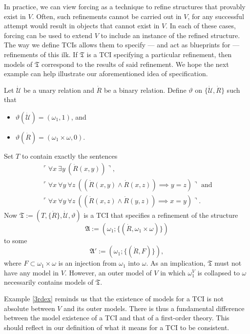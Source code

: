\documentclass[12pt]{article}
\numberwithin{equation}{section}
\begin{document}
In practice, we can view forcing as a technique to refine structures that provably exist in $V$. Often, such refinements cannot be carried out in $V$, for any successful attempt would result in objects that cannot exist in $V$. In each of these cases, forcing can be used to extend $V$ to include an instance of the refined structure. The way we define TCIs allows them to specify --- and act as blueprints for --- refinements of this ilk. If $\mathfrak{T}$ is a TCI specifying a particular refinement, then models of $\mathfrak{T}$ correspond to the results of said refinement. We hope the next example can help illustrate our aforementioned idea of specification.

\begin{ex}\label{3rdex}
Let $\dot{\mathcal{U}}$ be a unary relation and $\dot{R}$ be a binary relation. Define $\vartheta$ on $\{\dot{\mathcal{U}}, \dot{R}\}$ such that
\begin{itemize}
    \item $\vartheta(\dot{\mathcal{U}}) = (\omega_1, 1)$, and
    \item $\vartheta(\dot{R}) = (\omega_1 \times \omega, 0)$.
\end{itemize}
Set $T$ to contain exactly the sentences 
\begin{gather*}
    \ulcorner \forall x \ \exists y \ (\dot{R}(x, y)) \urcorner \text{,} \\
    \ulcorner \forall x \ \forall y \ \forall z \ ((\dot{R}(x, y) \wedge \dot{R}(x, z)) \implies y = z) \urcorner \text{ and} \\
    \ulcorner \forall x \ \forall y \ \forall z \ ((\dot{R}(x, z) \wedge \dot{R}(y, z)) \implies x = y) \urcorner \text{.}
\end{gather*}
Now $\mathfrak{T} := (T, \{\dot{R}\}, \dot{\mathcal{U}}, \vartheta)$ is a TCI that specifies a refinement of the structure $$\mathfrak{A} := (\omega_1; \{(\dot{R}, \omega_1 \times \omega)\})$$ to some $$\mathfrak{A}' := (\omega_1; \{(\dot{R}, F)\}),$$ where $F \subset \omega_1 \times \omega$ is an injection from $\omega_1$ into $\omega$. As an implication, $\mathfrak{T}$ must not have any model in $V$. However, an outer model of $V$ in which $\omega_1^V$ is collapsed to $\omega$ necessarily contains models of $\mathfrak{T}$.
\end{ex}

Example \ref{3rdex} reminds us that the existence of models for a TCI is not absolute between $V$ and its outer models. There is thus a fundamental difference between the model existence of a TCI and that of a first-order theory. This should reflect in our definition of what it means for a TCI to be consistent.
\end{document}
